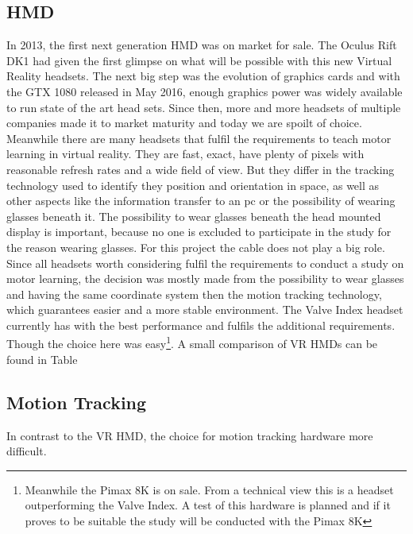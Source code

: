 \subsection{HMD}
In 2013, the first next generation HMD was on market for sale. The Oculus Rift DK1 had given the first glimpse on what will be possible with this new Virtual Reality headsets. The next big step was the evolution of graphics cards and with the GTX 1080 released in May 2016, enough graphics power was widely available to run state of the art head sets. Since then, more and more headsets of multiple companies made it to market maturity and today we are spoilt of choice. Meanwhile there are many headsets that fulfil the requirements to teach motor learning in virtual reality. They are fast, exact, have plenty of pixels with reasonable refresh rates and a wide field of view. But they differ in the tracking technology used to identify they position and orientation in space, as well as other aspects like the information transfer to an pc or the possibility of wearing glasses beneath it. The possibility to wear glasses beneath the head mounted display is important, because no one is excluded to participate in the study for the reason wearing glasses. For this project the cable does not play a big role. Since all headsets worth considering fulfil the requirements to conduct a study on motor learning, the decision was mostly made from the possibility to wear glasses and having the same coordinate system then the motion tracking technology, which guarantees easier and a more stable environment. The Valve Index headset currently has with the best performance and fulfils the additional requirements. Though the choice here was easy\footnote{Meanwhile the Pimax 8K is on sale. From a technical view this is a headset outperforming the Valve Index. A test of this hardware is planned and if it proves to be suitable the study will be conducted with the Pimax 8K}. A small comparison of VR HMDs can be found in Table %
\subsection{Motion Tracking}
In contrast to the VR HMD, the choice for motion tracking hardware more difficult.\\

